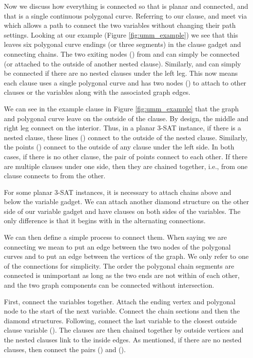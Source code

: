 \documentclass{article}[11pt]
\begin{document}
Now we discuss how everything is connected so that  is planar and connected, and that  is
a single continuous polygonal curve. Referring to our clause,
 and  meet via  which allows a path to connect the two variables
without changing their path settings.  Looking at our example (Figure \ref{fig:umm_example})
we see that this leaves six polygonal curve endings (or three segments) in the clause gadget and connecting chains.  
The two exiting nodes ()
from  and  can simply be connected (or attached to the outside of another nested clause).
Similarly,  and  can simply be connected if there are no nested clauses under the left leg.
This now means each clause uses a single polygonal curve and has two nodes () to attach to other 
clauses or the variables along with the associated graph edges.



We can see in the example clause in Figure \ref{fig:umm_example} that the graph and polygonal curve leave
on the outside of the clause.  By design, the middle and right leg connect on the interior.  Thus, in
a planar 3-SAT instance, if there is a nested clause, these lines () connect to the outside of the nested clause.
Similarly, the points () connect to the outside of any clause under the left side.  In both cases,
if there is no other clause, the pair of points connect to each other.
If there are multiple clauses under one side, then they are chained together, 
i.e.,  from one clause connects to  from the other.

For some planar 3-SAT instances, it is necessary to attach chains above and below the variable gadget.
We can attach another diamond structure on the other side of our variable gadget and have
clauses on both sides of the variables. The only difference is that it begins with  in the alternating connections.

We can then define a simple process to connect them.  When saying we are connecting we mean to put
an edge between the two nodes of the polygonal curves and to put an edge between the vertices of the
graph.  We only refer to one of the connections for simplicity.
The order the polygonal chain segments are connected is unimportant as long as the two ends are not within  of
each other, and the two graph components can be connected without intersection.

First, connect the variables together. Attach the ending vertex and polygonal node to the 
start of the next variable.  Connect the chain sections and then the diamond structures.
Following, connect the last variable to the closest outside clause variable ().  
The clauses are then chained together by outside vertices and the nested clauses link to the inside edges.  
As mentioned, if there are no nested clauses, then connect the pairs () and (). 
\end{document}
